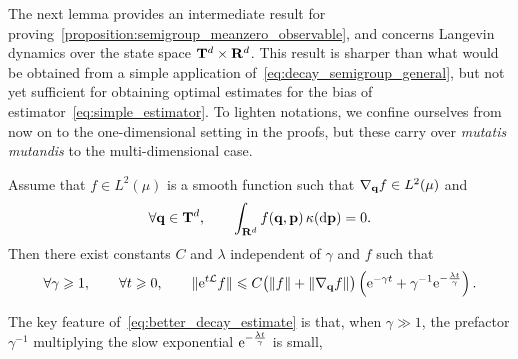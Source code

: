 \documentclass[11pt,a4paper]{article}
\begin{document}

The next lemma provides an intermediate result for proving~\cref{proposition:semigroup_meanzero_observable},
and concerns Langevin dynamics over the state space $\mathbf T^d \times \mathbf R^d$.
This result is sharper than what would be obtained from a simple application of~\eqref{eq:decay_semigroup_general},
but not yet sufficient for obtaining optimal estimates for the bias of estimator~\eqref{eq:simple_estimator}.
To lighten notations,
we confine ourselves from now on to the one-dimensional setting in the proofs,
but these carry over \emph{mutatis mutandis} to the multi-dimensional case.
\begin{lemma}
    \label{lemma:initial_lemma}
    Assume that $f \in L^2(\mu)$ is a smooth function such that $\nabla_{\boldsymbol{\mathbf q}} f \in L^2(\mu)$ and
    \begin{equation}
        \label{eq:assumption_f}
        \forall \boldsymbol{\mathbf q} \in \mathbf T^d, \qquad
        \int_{\mathbf R^d} f(\boldsymbol{\mathbf q}, \boldsymbol{\mathbf p}) \, \kappa(\mathrm d \boldsymbol{\mathbf p}) = 0.
    \end{equation}
    Then there exist constants $C$ and $\lambda$ independent of $\gamma$ and $f$ such that
    \begin{align}
        \label{eq:better_decay_estimate}
        \forall \gamma \geq 1, \qquad
        \forall t \geq 0, \qquad
        \norm*{\e^{t\mathcal L} f}
        \leq C \bigl( \norm{f} + \norm{\grad_{\vect q} f} \bigr)
        \left( \e^{- \gamma t} + \gamma^{-1} \e^{-\frac{\lambda t}{\gamma}} \right).
    \end{align}
\end{lemma}
The key feature of~\eqref{eq:better_decay_estimate} is that,
when $\gamma \gg 1$,
the prefactor $\gamma^{-1}$ multiplying the slow exponential $\mathrm{e}^{-\frac{\lambda t}{\gamma}}$ is small,
\end{document}
